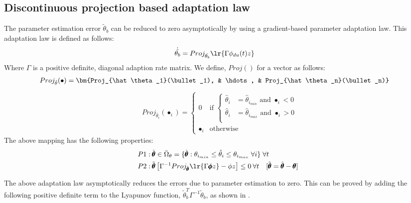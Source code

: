 \subsection{Discontinuous projection based adaptation law}
The parameter estimation error $\tilde \theta_b$ can be reduced to zero asymptotically by using a gradient-based parameter adaptation law. This adaptation law is defined as follows:
\begin{align}
    \dot{\hat{\theta_b}} &= Proj_{\hat{\theta_b}}\lr{\Gamma \phi_{du}(t) z}
\end{align}
Where $\Gamma$ is a positive definite, diagonal adaption rate matrix.
We define,  $Proj()$ for a vector as follows:
\begin{align}
    &Proj_{\hat{\theta}} (\bullet) = \bm{Proj_{\hat \theta_1}(\bullet_1), &
                                        \hdots, &
                                        Proj_{\hat \theta_n}(\bullet_n)}
\end{align}
\begin{align}
    &Proj_{\hat \theta_i}(\bullet_i)
    = \begin{cases}
        0 & \text{if } \begin{cases}
                        \hat \theta_i &= \hat \theta_{i_{min}} \text{  and  } \bullet_i < 0\\
                        \hat \theta_i &= \hat \theta_{i_{max}} \text{  and  } \bullet_i > 0\\
                       \end{cases}\\
        \bullet_i & \text{otherwise}
    \end{cases}
\end{align}
The above mapping has the following properties:
    \begin{align}
        P1: & \: \hat{\pmb \theta} \in \bar \Omega_{\theta}=\{\hat{\pmb \theta} :
        \theta_{i_{min}} \leq \hat \theta_i \leq \theta_{i_{max}} \; \forall
        i\} \; \forall t\\
        P2: & \: \tilde{\pmb{\theta}} \left[ \Gamma^{-1} Proj_{\hat{\pmb\theta}}
        \lr{\Gamma \pmb \phi z} - \phi z \right] \leq 0 \: \forall t \quad
        [\tilde{\pmb{\theta}} = \hat{\pmb\theta} - \pmb \theta]
    \end{align}

The above adaptation law asymptotically reduces the errors due to parameter
estimation to zero. This can be proved by adding the following positive
definite term to the Lyapunov function, $\tilde \theta_b^T \Gamma^{-1} \tilde
\theta_b$, as shown in \cite{yao1998desired}.

%
